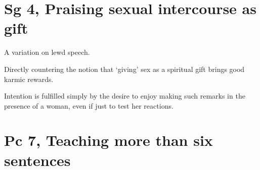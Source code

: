 \section{Sg 4, Praising sexual intercourse as gift}

A variation on lewd speech.

Directly countering the notion that `giving' sex as a spiritual gift
brings good karmic rewards.

Intention is fulfilled simply by the desire to enjoy making such remarks
in the presence of a woman, even if just to test her reactions.

\section{Pc 7, Teaching more than six sentences}

